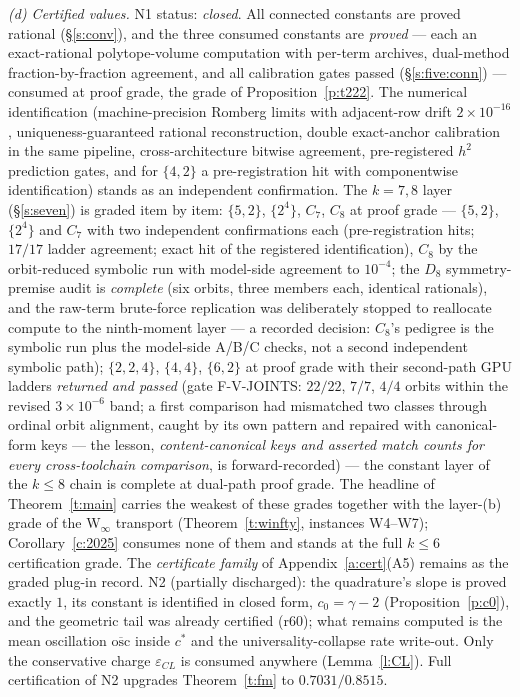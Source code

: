 \documentclass[11pt]{article}
\numberwithin{equation}{section}
\theoremstyle{definition}
\theoremstyle{remark}
\begin{document}
\emph{(d) Certified values.} N1 status: \emph{closed}. All
connected constants are proved rational (\S\ref{s:conv}), and
the three consumed constants are \emph{proved} --- each an
exact-rational polytope-volume computation with per-term
archives, dual-method fraction-by-fraction agreement, and all
calibration gates passed (\S\ref{s:five:conn}) --- consumed
at proof grade, the grade of Proposition~\ref{p:t222}. The
numerical identification (machine-precision Romberg limits
with adjacent-row drift $2\times10^{-16}$,
uniqueness-guaranteed rational reconstruction, double
exact-anchor calibration in the same pipeline,
cross-architecture bitwise agreement, pre-registered $h^{2}$
prediction gates, and for $\{4,2\}$ a pre-registration hit
with componentwise identification) stands as an independent
confirmation.
The $k=7,8$ layer (\S\ref{s:seven}) is graded item by item:
$\{5,2\}$, $\{2^4\}$, $C_7$, $C_8$ at proof grade ---
$\{5,2\}$, $\{2^4\}$ and $C_7$ with two independent
confirmations each (pre-registration hits; $17/17$ ladder
agreement; exact hit of the registered identification), $C_8$
by the orbit-reduced symbolic run with model-side agreement to
$10^{-4}$; the $D_8$ symmetry-premise audit is
\emph{complete} (six orbits, three members each, identical
rationals), and the raw-term brute-force replication was
deliberately stopped to reallocate compute to the ninth-moment
layer --- a recorded decision: $C_8$'s pedigree is the
symbolic run plus the model-side A/B/C checks, not a second
independent symbolic path);
$\{2,2,4\}$, $\{4,4\}$, $\{6,2\}$ at proof grade with their
second-path GPU ladders \emph{returned and passed} (gate
F-V-JOINTS: $22/22$, $7/7$, $4/4$ orbits within the revised
$3\times10^{-6}$ band; a first comparison had mismatched two
classes through ordinal orbit alignment, caught by its own
pattern and repaired with canonical-form keys --- the lesson,
\emph{content-canonical keys and asserted match counts for
every cross-toolchain comparison}, is forward-recorded) ---
the constant layer of the $k\le8$ chain is complete at
dual-path proof grade. The headline of
Theorem~\ref{t:main} carries the weakest of these grades
together with the layer-(b) grade of the W$_\infty$ transport
(Theorem~\ref{t:winfty}, instances W4--W7);
Corollary~\ref{c:2025} consumes none of them and stands at
the full $k\le6$ certification grade. The \emph{certificate
family} of
Appendix~\ref{a:cert}(A5) remains as the graded plug-in
record. N2
(partially discharged): the quadrature's slope
is proved exactly $1$, its constant is identified in closed form,
$c_0=\gamma-2$ (Proposition~\ref{p:c0}), and the geometric tail
was already certified (r60); what remains computed is the mean
oscillation $\overline{\mathrm{osc}}$ inside $c^{*}$ and the
universality-collapse rate write-out. Only the conservative
charge $\varepsilon_{CL}$ is consumed anywhere
(Lemma~\ref{l:CL}). Full certification of N2 upgrades
Theorem~\ref{t:fm} to $0.7031/0.8515$.
\end{document}
